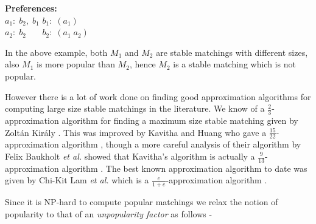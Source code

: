 \documentclass[a4paper,10pt]{article}
\theoremstyle{plain} %
\theoremstyle{plain} %
\begin{document}
\begin{center}
\textbf{Preferences:} \\
$a_1: \; b_2, \; b_1$ \; \; \; $b_1: \; (a_1)\phantom{ \; a_2}$ \\
$a_2: \; b_2\phantom{, \; b_1}$ \; \; \; $b_2: \; (a_1 \; a_2)$ \\
\end{center}

\begin{center}
\end{center}

In the above example, both $M_1$ and $M_2$ are stable matchings with different sizes, also $M_1$ is more popular than $M_2$, hence $M_2$ is a stable matching which is not popular.

However there is a lot of work done on finding good approximation algorithms for computing large size stable matchings in the literature. We know of a $\frac{2}{3}$-approximation algorithm for finding a maximum size stable matching given by Zoltán Király \cite{kiraly2011better}. This was improved by Kavitha and Huang who gave a $\frac{15}{22}$-approximation algorithm \cite{huang2015improved}, though a more careful analysis of their algorithm by Felix Baukholt \textit{et al.} showed that Kavitha's algorithm is actually a $\frac{9}{13}$-approximation algorithm \cite{bauckholt2018approximability}. The best known approximation algorithm to date was given by Chi-Kit Lam \textit{et al.} which is a $\frac{e}{1 + e}$-approximation algorithm \cite{lam20191+}.

Since it is NP-hard to compute popular matchings we relax the notion of popularity to that of an \textit{unpopularity factor} as follows -
\end{document}
